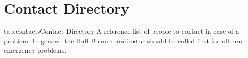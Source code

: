 
\chapter{Contact Directory}
\begin{namestab}{tab:contacts}{Contact Directory}{%
          A reference list of people to contact in case of a problem.   In general the Hall B run coordinator should be called first
          for all non-emergency problems.}
\end{namestab}


